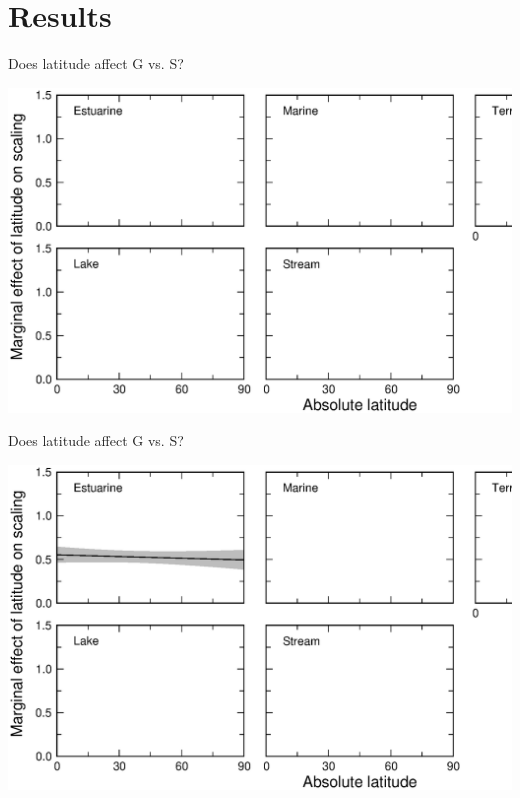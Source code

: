 \documentclass{beamer}
\begin{document}
\section*{Results}
  \begin{frame}{Does latitude affect G vs. S?}
    \begin{center}
      \includegraphics*[width=.8\textwidth]{Figures/results/Gen_vs_S_marginal_axis.eps}

    \end{center}
  \end{frame}


  \begin{frame}{Does latitude affect G vs. S?}
    \begin{center}
      \includegraphics*[width=.8\textwidth]{Figures/results/Gen_vs_S_marginal_one.eps}

    \end{center}
  \end{frame}
\end{document}
